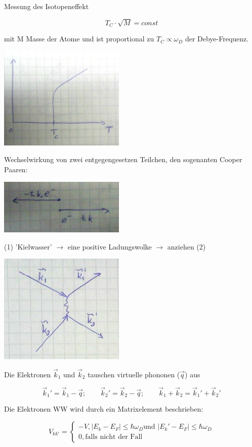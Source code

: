 Messung des Isotopeneffekt 

\[T_C\cdot \sqrt{M} = const\] 

mit M Masse der Atome und ist proportional zu \(T_C\propto \omega_D\) der Debye-Frequenz. 

\includegraphics[width=0.45\textwidth]{kap13_10.png}

Wechselwirkung von zwei entgegengesetzen Teilchen, den sogenanten Cooper Paaren:

\includegraphics[width=0.45\textwidth]{kap13_11.png}


(1) 'Kielwasser' \(\rightarrow \) eine positive Ladungswolke \(\rightarrow \) anziehen (2)

\includegraphics[width=0.45\textwidth]{kap13_12.png}

Die Elektronen \(\vec k_1\) und  \(\vec k_2\) tauschen virtuelle phononen (\(\vec q\)) aus

\[\vec k_1' = \vec k_1-\vec q;\qquad \vec k_2' = \vec k_2-\vec q; \qquad \vec k_1+\vec k_2 = \vec k_1'+\vec k_2' \]

Die Elektronen WW wird durch ein Matrixelement beschrieben:

\[V_{kk'} = \begin{cases}
  -V,|E_k-E_F|\leq\hbar\omega_D  \text{und } |E_k'-E_F|\leq \hbar\omega_D\\
  0, \text{falls nicht der Fall }
\end{cases}\]

